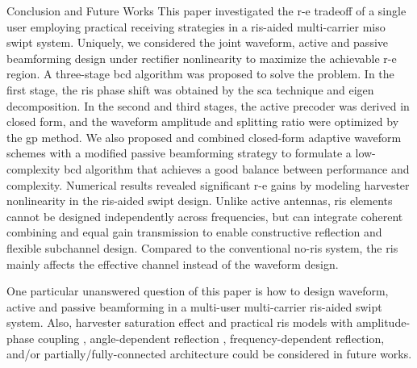 \begin{section}{Conclusion and Future Works}\label{se:conclusion_and_future_works}
	This paper investigated the \gls{r-e} tradeoff of a single user employing practical receiving strategies in a \gls{ris}-aided multi-carrier \gls{miso} \gls{swipt} system. Uniquely, we considered the joint waveform, active and passive beamforming design under rectifier nonlinearity to maximize the achievable \gls{r-e} region. A three-stage \gls{bcd} algorithm was proposed to solve the problem. In the first stage, the \gls{ris} phase shift was obtained by the \gls{sca} technique and eigen decomposition. In the second and third stages, the active precoder was derived in closed form, and the waveform amplitude and splitting ratio were optimized by the \gls{gp} method. We also proposed and combined closed-form adaptive waveform schemes with a modified passive beamforming strategy to formulate a low-complexity \gls{bcd} algorithm that achieves a good balance between performance and complexity. Numerical results revealed significant \gls{r-e} gains by modeling harvester nonlinearity in the \gls{ris}-aided \gls{swipt} design. Unlike active antennas, \gls{ris} elements cannot be designed independently across frequencies, but can integrate coherent combining and equal gain transmission to enable constructive reflection and flexible subchannel design. Compared to the conventional no-\gls{ris} system, the \gls{ris} mainly affects the effective channel instead of the waveform design.

	One particular unanswered question of this paper is how to design waveform, active and passive beamforming in a multi-user multi-carrier \gls{ris}-aided \gls{swipt} system. Also, harvester saturation effect and practical \gls{ris} models with amplitude-phase coupling \cite{Abeywickrama2020}, angle-dependent reflection \cite{Tang2021}, frequency-dependent reflection, and/or partially/fully-connected architecture \cite{Shen2020a} could be considered in future works.
\end{section}

